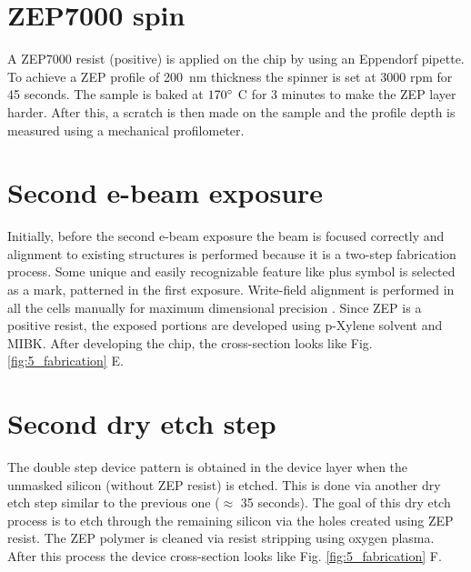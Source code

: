\documentclass[../report.tex]{subfiles}
\begin{document}
\section{ZEP7000 spin}
A ZEP7000 resist (positive) is applied on the chip by using an Eppendorf pipette. To achieve a ZEP profile of \SI{200}{\nano \meter} thickness the spinner is set at 3000 rpm for 45 seconds. The sample is baked at $\mathrm{170^{\circ}}$ C for 3 minutes to make the ZEP layer harder. After this, a scratch is then made on the sample and the profile depth is measured using a mechanical profilometer.

\section{Second e-beam exposure}
Initially, before the second e-beam exposure the beam is focused correctly and alignment to existing structures is performed because it is a two-step fabrication process. Some unique and easily recognizable feature like plus symbol is selected as a mark, patterned in the first exposure. Write-field alignment is performed in all the cells manually for maximum dimensional precision \cite{write_field}. Since ZEP is a positive resist, the exposed portions are developed using p-Xylene solvent and MIBK. After developing the chip, the cross-section looks like Fig. \ref{fig:5_fabrication} E.

\section{Second dry etch step}
The double step device pattern is obtained in the device layer when the unmasked silicon (without ZEP resist) is etched. This is done via another dry etch step similar to the previous one ($\approx$ 35 seconds). The goal of this dry etch process is to etch through the remaining silicon via the holes created using ZEP resist. The ZEP polymer is cleaned via resist stripping using oxygen plasma. After this process the device cross-section looks like Fig. \ref{fig:5_fabrication} F. 
\end{document}
